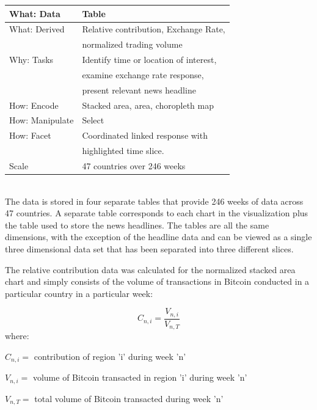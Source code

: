 \documentclass[journal]{vgtc}                %
\begin{document}
\begin{tabular}{|l|l|}
\hline
	What: Data & Table \\ \hline
 	What: Derived & Relative contribution, Exchange Rate, \\&normalized trading volume \\ \hline
 	Why: Tasks & Identify time or location of interest, \\&examine exchange rate response, \\&present relevant news headline \\ \hline
 	How: Encode & Stacked area, area, choropleth map \\ \hline
 	How: Manipulate & Select \\ \hline
 	How: Facet & Coordinated linked response with \\&highlighted time slice.\ \\ \hline
 	Scale & 47 countries over 246 weeks \\ \hline
\end{tabular}\\
 
The data is stored in four separate tables that provide 246 weeks of data across 47 countries.  A separate table corresponds to each chart in the visualization plus the table used to store the news headlines.  The tables are all the same dimensions, with the exception of the headline data and can be viewed as a single three dimensional data set that has been separated into three different slices.  

The relative contribution data was calculated for the normalized stacked area chart and simply consists of the volume of transactions in Bitcoin conducted in a particular country in a particular week:

\begin{equation}\label{key}
C_{n,i} = \frac{V_{n,i}}{V_{n,T}}
\end{equation}
where:

$ C_{n,i} = $ contribution of region 'i' during week 'n' 

$ V_{n,i} = $ volume of Bitcoin transacted in region 'i' during week 'n'

$ V_{n,T} = $ total volume of Bitcoin transacted during week 'n'\\
\end{document}
